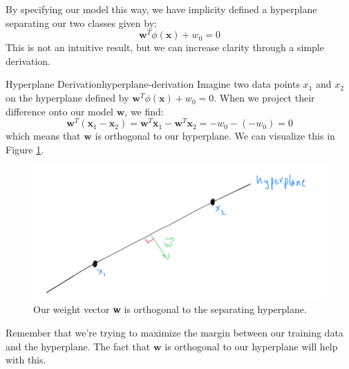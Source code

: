By specifying our model this way, we have implicity defined a hyperplane separating our two classes given by:
\begin{equation} \label{implicit-hyperplane}
	\textbf{w}^{T}\phi(\textbf{x}) + w_{0} = 0
\end{equation}
This is not an intuitive result, but we can increase clarity through a simple derivation.

\begin{derivation}{Hyperplane Derivation}{hyperplane-derivation}
	Imagine two data points $x_{1}$ and $x_{2}$ on the hyperplane defined by $\textbf{w}^{T}\phi(\textbf{x}) + w_{0} = 0$. When we project their difference onto our model $\textbf{w}$, we find:
	\begin{equation} \label{hyperplane-eqn}
		\textbf{w}^{T}(\textbf{x}_{1} - \textbf{x}_{2}) = \textbf{w}^{T}\textbf{x}_{1} - \textbf{w}^{T}\textbf{x}_{2} = -w_{0} - (-w_{0}) = 0
	\end{equation}
	which means that $\textbf{w}$ is orthogonal to our hyperplane. We can visualize this in Figure \ref{fig:orthogonal-w}.
\end{derivation}

\begin{figure}
    \centering
    \includegraphics[width=0.5\paperwidth]{../SupportVectorMachines/fig/orthogonal-w.png}
    \caption{Our weight vector \textbf{w} is orthogonal to the separating hyperplane.}
    \label{fig:orthogonal-w}
\end{figure}

Remember that we're trying to maximize the margin between our training data and the hyperplane. The fact that $\textbf{w}$ is orthogonal to our hyperplane will help with this.

